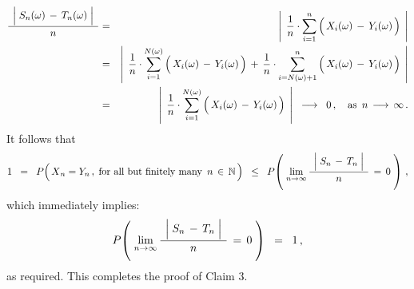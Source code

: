 \begin{enumerate}
\begin{eqnarray*}
\dfrac{{\color{white}.}
	\left\vert\;
	S_{n}(\omega) \,\overset{{\color{white}.}}{-}\, T_{n}(\omega)
	\;\right\vert
	{\color{white}.}}{
	n
	}
& = &
	\left\vert\;\,
		\dfrac{1}{n}\cdot
		\overset{n}{\underset{i=1}{\sum}}
		\left(\,X_{i}(\omega) \,\overset{{\color{white}.}}{-}\, Y_{i}(\omega)\,\right)
		\;\,\right\vert
\\
& = &
	\left\vert\;\,
		\dfrac{1}{n}\cdot
		\overset{N(\omega)}{\underset{i=1}{\sum}}
		\left(\,X_{i}(\omega) \,\overset{{\color{white}.}}{-}\, Y_{i}(\omega)\,\right)
		\,+\,
		\dfrac{1}{n}\cdot
		\overset{n}{\underset{i=N(\omega)+1}{\sum}}
		\left(\,X_{i}(\omega) \,\overset{{\color{white}.}}{-}\, Y_{i}(\omega)\,\right)
		\;\,\right\vert
\\
& = &
	\left\vert\;\,
		\dfrac{1}{n}\cdot
		\overset{N(\omega)}{\underset{i=1}{\sum}}
		\left(\,X_{i}(\omega) \,\overset{{\color{white}.}}{-}\, Y_{i}(\omega)\,\right)
		\;\,\right\vert
	\;\; \longrightarrow \;\; 0\,,
	\quad\textnormal{as \,$n \, \longrightarrow \, \infty$}\,.
\end{eqnarray*}
It follows that
\begin{equation*}
1
\;\; = \;\; 
	P\!\left(\,\overset{{\color{white}.}}{X}_{n} = Y_{n}\,,\;\textnormal{for all but finitely many \,$n\,\in\,\N$}\,\right)
\;\; \leq \;\;
	P\!\left(\;
		\underset{n\rightarrow\infty}{\lim}\,
		\dfrac{{\color{white}.}
			\left\vert\;
			S_{n} \,\overset{{\color{white}.}}{-}\, T_{n}
			\;\right\vert
			{\color{white}.}}{
			n
			}
			\,=\, 0
		\;\right)\,,
\end{equation*}
which immediately implies:
\begin{equation*}
P\!\left(\;
	\underset{n\rightarrow\infty}{\lim}\,
	\dfrac{{\color{white}.}
		\left\vert\;
		S_{n} \,\overset{{\color{white}.}}{-}\, T_{n}
		\;\right\vert
		{\color{white}.}}{
		n
		}
		\,=\, 0
	\;\right)
\;\; = \;\;
	1\,,
\end{equation*}
as required.
This completes the proof of Claim 3.


\end{enumerate}
